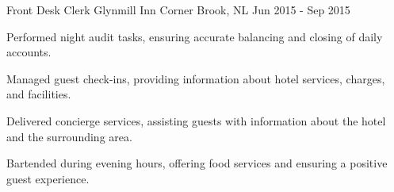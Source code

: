 \begin{cventries}
	\cventry
	{Front Desk Clerk} %
	{Glynmill Inn} %
	{Corner Brook, NL} %
	{Jun 2015 - Sep 2015} %
	{
		\begin{cvitems} %
			\item {Performed night audit tasks, ensuring accurate balancing and closing of daily accounts.}
			\item {Managed guest check-ins, providing information about hotel services, charges, and facilities.}
			\item {Delivered concierge services, assisting guests with information about the hotel and the surrounding area.}
			\item {Bartended during evening hours, offering food services and ensuring a positive guest experience.}
		\end{cvitems}
	}
	
\end{cventries}
